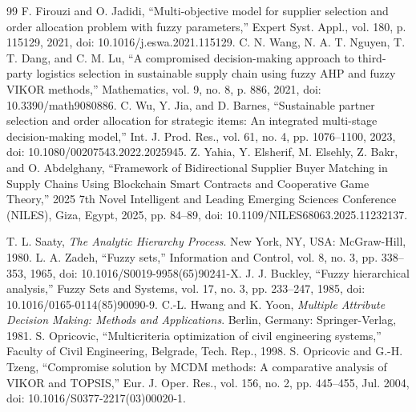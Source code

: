 \documentclass[11pt]{article}
\begin{document}
\begin{thebibliography}{99}
 F. Firouzi and O. Jadidi, ``Multi-objective model for supplier selection and order allocation problem with fuzzy parameters,'' Expert Syst. Appl., vol. 180, p. 115129, 2021, doi: 10.1016/j.eswa.2021.115129.
 C. N. Wang, N. A. T. Nguyen, T. T. Dang, and C. M. Lu, ``A compromised decision-making approach to third-party logistics selection in sustainable supply chain using fuzzy AHP and fuzzy VIKOR methods,'' Mathematics, vol. 9, no. 8, p. 886, 2021, doi: 10.3390/math9080886.
 C. Wu, Y. Jia, and D. Barnes, ``Sustainable partner selection and order allocation for strategic items: An integrated multi-stage decision-making model,'' Int. J. Prod. Res., vol. 61, no. 4, pp. 1076--1100, 2023, doi: 10.1080/00207543.2022.2025945.
 Z. Yahia, Y. Elsherif, M. Elsehly, Z. Bakr, and O. Abdelghany, ``Framework of Bidirectional Supplier Buyer Matching in Supply Chains Using Blockchain Smart Contracts and Cooperative Game Theory,'' 2025 7th Novel Intelligent and Leading Emerging Sciences Conference (NILES), Giza, Egypt, 2025, pp. 84--89, doi: 10.1109/NILES68063.2025.11232137.

 T. L. Saaty, \textit{The Analytic Hierarchy Process}. New York, NY, USA: McGraw-Hill, 1980.
 L. A. Zadeh, ``Fuzzy sets,'' Information and Control, vol. 8, no. 3, pp. 338--353, 1965, doi: 10.1016/S0019-9958(65)90241-X.
 J. J. Buckley, ``Fuzzy hierarchical analysis,'' Fuzzy Sets and Systems, vol. 17, no. 3, pp. 233--247, 1985, doi: 10.1016/0165-0114(85)90090-9.
 C.-L. Hwang and K. Yoon, \textit{Multiple Attribute Decision Making: Methods and Applications}. Berlin, Germany: Springer-Verlag, 1981.
 S. Opricovic, ``Multicriteria optimization of civil engineering systems,'' Faculty of Civil Engineering, Belgrade, Tech. Rep., 1998.
 S. Opricovic and G.-H. Tzeng, ``Compromise solution by MCDM methods: A comparative analysis of VIKOR and TOPSIS,'' Eur. J. Oper. Res., vol. 156, no. 2, pp. 445--455, Jul. 2004, doi: 10.1016/S0377-2217(03)00020-1.
\end{thebibliography}
\end{document}
